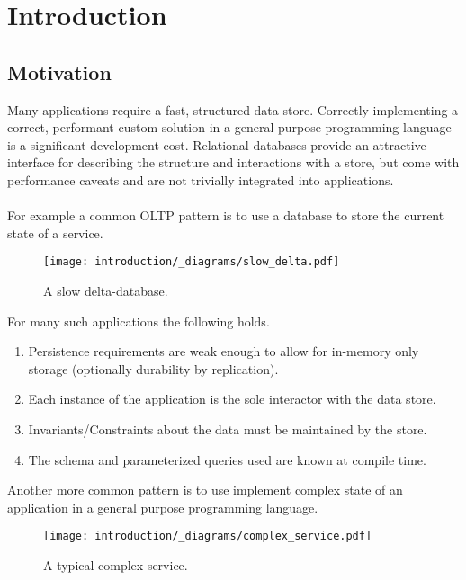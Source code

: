 \chapter{Introduction}
\section{Motivation}
Many applications require a fast, structured data store. Correctly implementing
a correct, performant custom solution in a general purpose programming language is a significant development cost.
Relational databases provide an attractive interface for describing the structure
and interactions with a store, but come with performance caveats and are not trivially integrated into applications.
\\
\\ For example a common OLTP pattern is to use a database to store the current state of a service.
\begin{figure}[h!]
    \centering
    \texttt{[image: introduction/\_diagrams/slow\_delta.pdf]}
    \caption{A slow delta-database.}
\end{figure}
\noindent For many such applications the following holds.
\begin{enumerate}
    \setlength\itemsep{0em}
    \item Persistence requirements are weak enough to allow for in-memory only storage (optionally durability by replication).
    \item Each instance of the application is the sole interactor with the data store.
    \item Invariants/Constraints about the data must be maintained by the store.
    \item The schema and parameterized queries used are known at compile time. \label{lab:known_queries_item}
\end{enumerate}
Another more common pattern is to use implement complex state of an application in a general purpose programming language.

\begin{figure}[h!]
    \centering
    \texttt{[image: introduction/\_diagrams/complex\_service.pdf]}
    \caption{A typical complex service.}
\end{figure}

